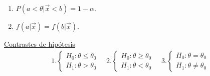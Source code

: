 \begin{enumerate}
    \item $P(a < \theta | \vec{x} < b) = 1 - \alpha$.
    \item $f(a | \vec{x}) = f(b | \vec{x})$.
\end{enumerate}
\noindent \underline{Contrastes de hipótesis}
\begin{align*}
   1. \begin{cases}
        H_0 : \theta \leq \theta_0 \\
        H_1 : \theta > \theta_0
    \end{cases} \quad     2.\begin{cases}
        H_0 : \theta \ge \theta_0 \\
        H_1 : \theta < \theta_0
    \end{cases} \quad     3.\begin{cases}
        H_0 : \theta = \theta_0 \\
        H_1 : \theta \not = \theta_0
    \end{cases}
\end{align*}

